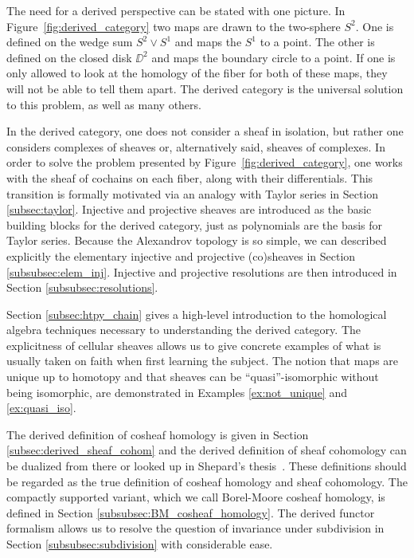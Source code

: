The need for a derived perspective can be stated with one picture. In Figure~\ref{fig:derived_category} two maps are drawn to the two-sphere $S^2$. One is defined on the wedge sum $S^2\vee S^1$ and maps the $S^1$ to a point. The other is defined on the closed disk $\DD^2$ and maps the boundary circle to a point. If one is only allowed to look at the homology of the fiber for both of these maps, they will not be able to tell them apart. The derived category is the universal solution to this problem, as well as many others. 

In the derived category, one does not consider a sheaf in isolation, but rather one considers complexes of sheaves or, alternatively said, sheaves of complexes. In order to solve the problem presented by Figure~\ref{fig:derived_category}, one works with the sheaf of cochains on each fiber, along with their differentials. This transition is formally motivated via an analogy with Taylor series in Section \ref{subsec:taylor}. Injective and projective sheaves are introduced as the basic building blocks for the derived category, just as polynomials are the basis for Taylor series. Because the Alexandrov topology is so simple, we can described explicitly the elementary injective and projective (co)sheaves in Section \ref{subsubsec:elem_inj}. Injective and projective resolutions are then introduced in Section \ref{subsubsec:resolutions}.

Section \ref{subsec:htpy_chain} gives a high-level introduction to the homological algebra techniques necessary to understanding the derived category. The explicitness of cellular sheaves allows us to give concrete examples of what is usually taken on faith when first learning the subject. The notion that maps are unique up to homotopy and that sheaves can be ``quasi''-isomorphic without being isomorphic, are demonstrated in Examples \ref{ex:not_unique} and \ref{ex:quasi_iso}.

The derived definition of cosheaf homology is given in Section \ref{subsec:derived_sheaf_cohom} and the derived definition of sheaf cohomology can be dualized from there or looked up in Shepard's thesis~\cite{shepard}. These definitions should be regarded as the true definition of cosheaf homology and sheaf cohomology. The compactly supported variant, which we call Borel-Moore cosheaf homology, is defined in Section \ref{subsubsec:BM_cosheaf_homology}. The derived functor formalism allows us to resolve the question of invariance under subdivision in Section \ref{subsubsec:subdivision} with considerable ease.

